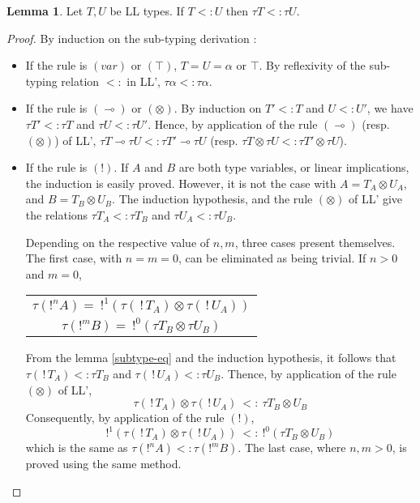 \documentclass[10pt]{article}
\theoremstyle{plain}
\theoremstyle{definition}
\newtheorem{lemma}{Lemma}[section]
\def\bang{\,!\,}
\begin{document}
\begin{lemma}
	\label{subLL=>subLL'}
	Let $T, U$ be LL types. If $T <: U$ then $\tau T <: \tau U$.

	\begin{proof}
		By induction on the sub-typing derivation :
		\begin{itemize}
			\item If the rule is $(var)$ or $(\top)$, $T = U = \alpha$ or $\top$.
				By reflexivity of the sub-typing relation $<:$ in LL', $\tau \alpha <: \tau \alpha$.
			
			\item If the rule is $(\multimap)$ or $(\otimes)$. By induction on $T' <: T$ and $U <: U'$, we have $\tau T' <: \tau T$ and
				$\tau U <: \tau U'$. Hence, by application of the rule $(\multimap)$ (resp. $(\otimes)$) of LL',
				$\tau T \multimap \tau U <: \tau T' \multimap \tau U$ (resp. $\tau T \otimes \tau U <: \tau T' \otimes \tau U$).			
				
			\item If the rule is $(!)$. If $A$ and $B$ are both type variables, or linear implications, the induction is easily proved.
				However, it is not the case with $A = T_A \otimes U_A$, and $B = T_B \otimes U_B$.
				The induction hypothesis, and the rule $(\otimes)$ of LL' give the relations $\tau T_A <: \tau T_B$ and $\tau U_A <: \tau U_B$.
				
				Depending on the respective value of $n, m$, three cases present themselves.
				The first case, with $n = m = 0$, can be eliminated as being trivial.
				If $n > 0$ and $m = 0$,
					\begin{center}
					\begin{tabular}{c}
					$\tau (!^n A) = ~ !^1 (\tau (\bang T_A) \otimes \tau (\bang U_A))$ \\
					$\tau (!^m B) = ~ !^0 (\tau T_B \otimes \tau U_B)$					
					\end{tabular}
					\end{center}
				From the lemma \ref{subtype-eq} and the induction hypothesis, it follows that $\tau (\bang T_A) <: \tau T_B$ and
				$\tau (\bang U_A) <: \tau U_B$. Thence, by application of the rule $(\otimes)$ of LL',
					$$ \tau (\bang T_A) \otimes \tau (\bang U_A) ~ <: ~ \tau T_B \otimes U_B$$
				Consequently, by application of the rule $(!)$,
					$$ !^1 (\tau (\bang T_A) \otimes \tau (\bang U_A)) ~ <: ~ !^0 (\tau T_B \otimes U_B)$$
				which is the same as $\tau (!^nA) <: \tau (!^mB)$.
				The last case, where $n, m > 0$, is proved using the same method.

		\end{itemize}
	\end{proof}
\end{lemma}
	
\end{document}

